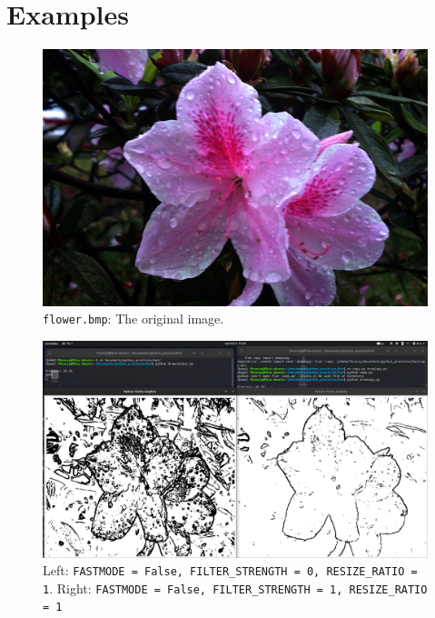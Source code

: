 \documentclass{article}
\begin{document}
\section{Examples}

\begin{figure}[H]
\centering
\includegraphics[width=\textwidth]{flower.bmp}
\caption{\texttt{flower.bmp}: The original image.}
\end{figure} 

\begin{figure}[H]
\centering
\includegraphics[width=\textwidth]{full.png}
\caption{Left: \texttt{FASTMODE = False, FILTER\_STRENGTH = 0, RESIZE\_RATIO = 1}. Right: \texttt{FASTMODE = False, FILTER\_STRENGTH = 1, RESIZE\_RATIO = 1}}
\end{figure} 
\end{document}
